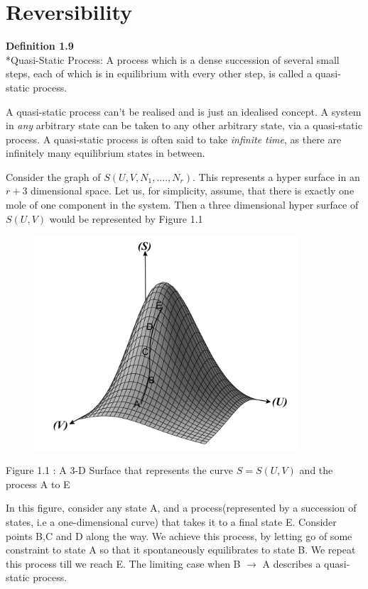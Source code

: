\documentclass[oneside]{book}
\begin{document}
\section{Reversibility}
\begin{mdframed}[style=exercise]
\textbf{Definition 1.9}
 \\*Quasi-Static Process: A process which is a dense succession of several small steps, each of which is in equilibrium with every other step, is called a quasi-static process.  \\ 
\end{mdframed}

A quasi-static process can't be realised and is just an idealised concept. A system in \emph{any} arbitrary state can be taken to any other arbitrary state, via a quasi-static process. A quasi-static process is often said to take \emph{infinite time}, as there are infinitely many equilibrium states in between.

Consider the graph of $S(U,V, N_1,....,N_r)$. This represents a hyper surface in an $r+3$ dimensional space. Let us, for simplicity, assume, that there is exactly one mole of one component in the system. Then a three dimensional hyper surface of $S(U,V)$ would be represented by Figure 1.1\\
\begin{center}
\includegraphics[width = 12cm, height = 8cm]{Curve1}
\end{center}
\begin{center}
Figure 1.1 : A 3-D Surface that represents the curve $S = S(U,V)$ and the process A to E
\end{center}

In this figure, consider any state A, and a process(represented by a succession of states, i.e a one-dimensional curve) that takes it to a final state E. Consider points B,C and D along the way. We achieve this process, by letting go of some constraint to state A so that it spontaneously equilibrates to state B. We repeat this process till we reach E. The limiting case when B $\rightarrow$ A describes a quasi-static process.\\
\end{document}
